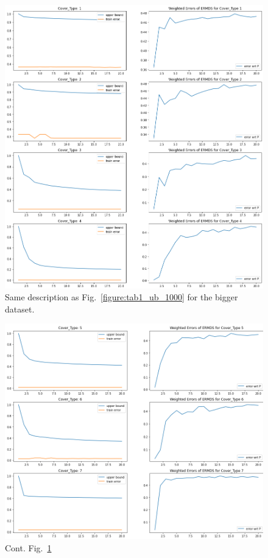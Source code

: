 \documentclass{scrartcl}
\begin{document}
\begin{figure}
  \includegraphics[width=1\textwidth]{imgs/N100000_T20/upper_bound_big_pt1.png}
  \centering
  \caption{Same description as Fig.~\ref{figure:tab1_ub_1000} for the bigger dataset.}
  \label{figure:tab1big}
\end{figure}
\begin{figure}
  \includegraphics[width=1\textwidth]{imgs/N100000_T20/upper_bound_big_pt2.png}
  \centering
  \caption{Cont. Fig.~\ref{figure:tab1big}}
  \label{figure:tab2big}
\end{figure}
\end{document}
